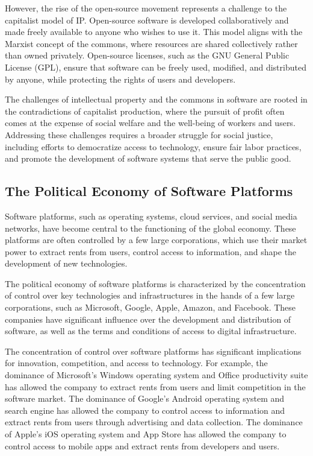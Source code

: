 \begin{refsection}
\begin{multicols}{2}
{However, the rise of the open-source movement represents a challenge to the capitalist model of IP. Open-source software is developed collaboratively and made freely available to anyone who wishes to use it. This model aligns with the Marxist concept of the commons, where resources are shared collectively rather than owned privately. Open-source licenses, such as the GNU General Public License (GPL), ensure that software can be freely used, modified, and distributed by anyone, while protecting the rights of users and developers.

The challenges of intellectual property and the commons in software are rooted in the contradictions of capitalist production, where the pursuit of profit often comes at the expense of social welfare and the well-being of workers and users. Addressing these challenges requires a broader struggle for social justice, including efforts to democratize access to technology, ensure fair labor practices, and promote the development of software systems that serve the public good.

\subsection{The Political Economy of Software Platforms}

Software platforms, such as operating systems, cloud services, and social media networks, have become central to the functioning of the global economy. These platforms are often controlled by a few large corporations, which use their market power to extract rents from users, control access to information, and shape the development of new technologies.

The political economy of software platforms is characterized by the concentration of control over key technologies and infrastructures in the hands of a few large corporations, such as Microsoft, Google, Apple, Amazon, and Facebook. These companies have significant influence over the development and distribution of software, as well as the terms and conditions of access to digital infrastructure.

The concentration of control over software platforms has significant implications for innovation, competition, and access to technology. For example, the dominance of Microsoft's Windows operating system and Office productivity suite has allowed the company to extract rents from users and limit competition in the software market. The dominance of Google's Android operating system and search engine has allowed the company to control access to information and extract rents from users through advertising and data collection. The dominance of Apple's iOS operating system and App Store has allowed the company to control access to mobile apps and extract rents from developers and users.

}
\end{multicols}
\end{refsection}
